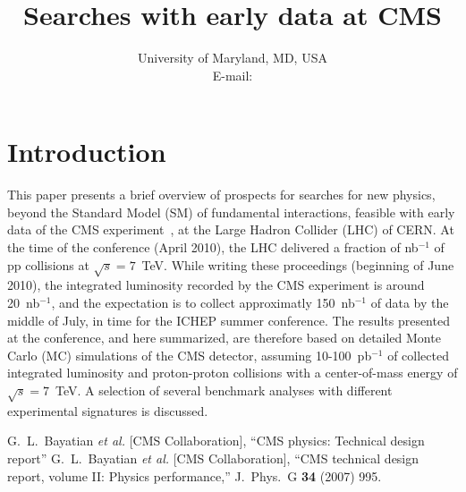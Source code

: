 \documentclass{PoS}
\title{Searches with early data at CMS}
\author{\speaker{Francesco Santanastasio}%
       University of Maryland, MD, USA\\
       E-mail: \email{francesco.santanastasio@cern.ch}}
\begin{document}
\section{Introduction}
This paper presents a brief overview of prospects for searches for new physics, 
beyond the Standard Model (SM) of fundamental interactions, feasible with early data of the 
CMS experiment~\cite{Bayatian:2006zz}, at the Large Hadron Collider (LHC) of CERN.
At the time of the conference (April 2010), the LHC delivered a fraction of nb$^{-1}$ 
of pp collisions at $\sqrt{s} = 7$~TeV. While writing these proceedings 
(beginning of June 2010), the integrated luminosity recorded by the CMS experiment is 
around 20~nb$^{-1}$, and the expectation is to collect approximatly 150~nb$^{-1}$ of data
by the middle of July, in time for the ICHEP summer conference. 
The results presented at the conference, and here summarized, 
are therefore based on detailed Monte Carlo (MC) simulations of 
the CMS detector, assuming 10-100~pb$^{-1}$ 
of collected integrated luminosity and proton-proton collisions 
with a center-of-mass energy of $\sqrt{s} = 7$~TeV. 
A selection of several benchmark analyses with different experimental 
signatures is discussed. 

\begin{thebibliography}{0}
  G.~L.~Bayatian {\it et al.}  [CMS Collaboration],
  ``CMS physics: Technical design report''
 \quad
 G.~L.~Bayatian {\it et al.}  [CMS Collaboration],
 ``CMS technical design report, volume II: Physics performance,''
 J.\ Phys.\ G {\bf 34} (2007) 995.

\end{thebibliography}
\end{document}
